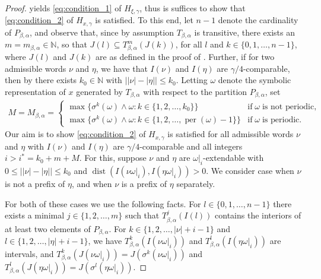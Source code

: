 \documentclass[a4paper,reqno,10pt]{amsart}
\begin{document}
\begin{proof}
 yields \eqref{eq:condition_1} of $H_{\xi, \gamma}$, thus is suffices to show that \eqref{eq:condition_2} of $H_{x, \gamma}$ is satisfied.  To this end, let $n-1$ denote the cardinality of $P_{\beta,\alpha}$, and observe that, since by assumption $T_{\beta, \alpha}$ is transitive, there exists an $m = m_{\beta, \alpha} \in \mathbb{N}$, so that $J(l) \subseteq T_{\beta,\alpha}^{m}(J(k))$, for all $l$ and $k \in \{0, 1, \ldots, n-1\}$, where $J(l)$ and $J(k)$ are as defined in the proof of .  Further, if for two admissible words $\nu$ and $\eta$, we have that $I(\nu)$ and $I(\eta)$ are $\gamma/4$-comparable, then by  there exists $k_{0} \in \mathbb{N}$ with $\lvert \lvert \nu \rvert - \lvert \eta \rvert \rvert \leq k_{0}$.  Letting $\omega$ denote the symbolic representation of $x$ generated by $T_{\beta, \alpha}$ with respect to the partition $P_{\beta,\alpha}$, set
    \begin{align*}
        M = M_{\beta, \alpha} = \begin{cases}
        \max \{ \sigma^{k}(\omega) \wedge \omega \colon k \in \{1, 2, \ldots, k_{0} \}\} & \text{if} \; \omega \; \text{is not periodic},\\
        \max \{ \sigma^{k}(\omega) \wedge \omega \colon k \in \{1, 2, \ldots, \operatorname{per}(\omega) -1 \}\} & \text{if} \; \omega \; \text{is periodic.}
        \end{cases}
    \end{align*}
Our aim is to show \eqref{eq:condition_2} of $H_{x, \gamma}$ is satisfied for all admissible words $\nu$ and $\eta$ with $I(\nu)$ and $I(\eta)$ are $\gamma/4$-comparable and all integers $i > i^{*} = k_{0} + m + M$. For this, suppose $\nu$ and $\eta$ are $\omega\vert_{i}$-extendable with $0 \leq \lvert \lvert \nu \rvert - \lvert \eta \rvert \rvert \leq k_{0}$ and $\operatorname{dist}(I(\nu\omega\vert_{i}), I(\eta\omega\vert_{i})) > 0$.  We consider case when $\nu$ is not a prefix of $\eta$, and when $\nu$ is a prefix of $\eta$ separately.

For both of these cases we use the following facts. For $l \in \{ 0, 1, \ldots, n-1\}$ there exists a minimal $j \in \{ 1, 2, \ldots, m \}$ such that $T_{\beta, \alpha}^{j}(I(l))$ contains the interiors of at least two elements of $P_{\beta,\alpha}$.  For $k \in \{1, 2, \ldots, \lvert \nu \rvert + i -1\}$ and $l \in \{1, 2, \ldots, \lvert \eta \rvert + i -1\}$, we have $T_{\beta, \alpha}^{k}(I(\nu \omega\vert_{i}))$ and $T_{\beta, \alpha}^{l}(I(\eta \omega\vert_{i}))$ are intervals, and $T_{\beta, \alpha}^{k}(J(\nu \omega\vert_{i})) = J(\sigma^{k}(\nu \omega\vert_{i}))$ and $T_{\beta, \alpha}^{l}(J(\eta \omega\vert_{i})) = J(\sigma^{l}(\eta \omega\vert_{i}))$.


\end{proof}
\end{document}
